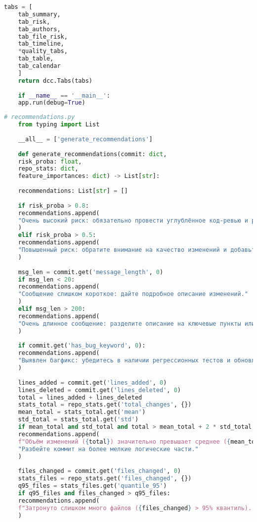 \begin{lstlisting}[language=Python, caption={{ \texttt{app.py}}}]
	tabs = [
	tab_summary,
	tab_risk,
	tab_authors,
	tab_file_risk,
	tab_timeline,
	*quality_tabs,
	tab_table,
	tab_calendar
	]
	return dcc.Tabs(tabs)
	
	if __name__ == '__main__':
	app.run(debug=True)
\end{lstlisting}

\begin{lstlisting}[language=Python, caption={{ \texttt{recommendationds.py}}}]
	# recommendations.py
	from typing import List
	
	__all__ = ['generate_recommendations']
	
	def generate_recommendations(commit: dict,
	risk_proba: float,
	repo_stats: dict,
	feature_importances: dict) -> List[str]:
	
	recommendations: List[str] = []
	
	if risk_proba > 0.8:
	recommendations.append(
	"Очень высокий риск: обязательно провести углублённое код-ревью и расширенное тестирование."
	)
	elif risk_proba > 0.5:
	recommendations.append(
	"Повышенный риск: обратите внимание на качество изменений и добавьте тесты."
	)
	
	msg_len = commit.get('message_length', 0)
	if msg_len < 20:
	recommendations.append(
	"Сообщение слишком короткое: дайте подробное описание изменений."
	)
	elif msg_len > 200:
	recommendations.append(
	"Очень длинное сообщение: разделите описание на ключевые пункты или используйте более лаконичные формулировки."
	)
	
	if commit.get('has_bug_keyword', 0):
	recommendations.append(
	"Выявлен багфикс: убедитесь в наличии регрессионных тестов и обновлении документации."
	)
	
	lines_added = commit.get('lines_added', 0)
	lines_deleted = commit.get('lines_deleted', 0)
	total = lines_added + lines_deleted
	stats_total = repo_stats.get('total_changes', {})
	mean_total = stats_total.get('mean')
	std_total = stats_total.get('std')
	if mean_total and std_total and total > mean_total + 2 * std_total:
	recommendations.append(
	f"Объём изменений ({total}) значительно превышает среднее ({mean_total:.1f}). "
	"Разбейте коммит на более мелкие логические части."
	)
	
	files_changed = commit.get('files_changed', 0)
	stats_files = repo_stats.get('files_changed', {})
	q95_files = stats_files.get('quantile_95')
	if q95_files and files_changed > q95_files:
	recommendations.append(
	f"Затронуто слишком много файлов ({files_changed} > 95% квантиль). Проверьте целостность изменений."
	)
	

\end{lstlisting}

